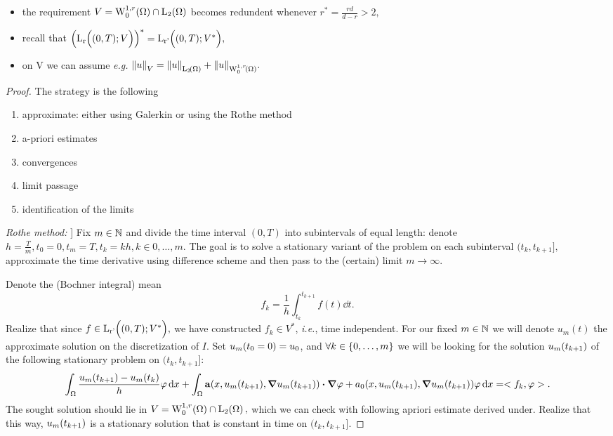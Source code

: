 \documentclass{article}
\begin{document}
	\begin{remark}
	    \begin{itemize}
		    \item the requirement $V = \WkpzeroSet[1][r]{\Omega} \cap \LpSet[2]{\Omega}$ becomes redundent whenever $r^{*} = \frac{rd}{d-r} >2,$ 
		    \item recall that $\qty(\text{L}_{\text{r}}\!\,\Bigl( (0,T);V \Bigr))^{*} = \text{L}_{\text{r'}}\!\,\Bigl( (0,T);V^{*} \Bigr),$ 
		    \item on V we can assume \textit{e.g.} $\norm{u}_V = \norm{u}_{\LpSet[2]{\Omega}} + \norm{u}_{\WkpzeroSet[1][r]{\Omega}}.$
	    \end{itemize}
	\end{remark}
\begin{proof}
	The strategy is the following 
	\begin{enumerate}
		\item approximate: either using Galerkin or using the Rothe method
		\item a-priori estimates
		\item convergences
		\item limit passage
		\item identification of the limits
	\end{enumerate}
	

	\textit{Rothe method:} ]
	Fix $m \in {\mathbb N}$ and divide the time interval $(0,T)$ into subintervals of equal length: denote $h = \frac{T}{m}, t_0 =0, t_m = T , t_k = kh, k \in {0,\dots, m}.$ The goal is to solve a stationary variant of the problem on each subinterval $(t_{k}, t_{k+1}],$ approximate the time derivative using difference scheme and then pass to the (certain) limit $m \to \infty.$

	Denote the (Bochner integral) mean
	\[
		f_k = \frac{1}{h} \int_{t_k}^{t_{k+1}}f(t)\dd{t}. 
	\]
	Realize that since $f \in \text{L}_{\text{r'}}\!\,\Bigl( (0,T);V^{*} \Bigr),$ we have constructed $f_k \in V^{*}$, \textit{i.e.}, time independent. For our fixed $m \in {\mathbb N}$ we will denote $u_m(t)$ the approximate solution on the discretization of $I$. Set $u_m\qty(t_0 = 0) = u_0$, and $\forall k \in \qty{0, \dots, m}$ we will be looking for the solution $u_m\qty(t_{k+1})$ of the following stationary problem on $(t_k, t_{k+1}]$:
	\[
		\int_{\Omega}\frac{u_m\qty(t_{k+1})- u_m\qty(t_k)}{h}\varphi\dd{x} + \int_{\Omega}\vb{a}\qty(x, u_m\qty(t_{k+1}), \grad u_m\qty(t_{k+1})) \vdot \grad \varphi + a_0\qty(x, u_m\qty(t_{k+1}), \grad u_m\qty(t_{k+1})) \varphi \dd{x} = <f_{k}, \varphi>.
	\]
The sought solution should lie in $V = \WkpzeroSet[1][r]{\Omega} \cap \LpSet[2]{\Omega},$ which we can check with following apriori estimate derived under. Realize that this way, $u_m\qty(t_{k+1})$ is a stationary solution that is constant in time on $(t_k, t_{k+1}].$ 


\end{proof}
\end{document}
